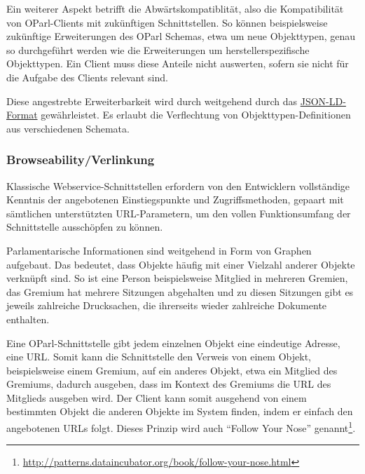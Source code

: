\documentclass[,a4paper]{article}
\begin{document}
Ein weiterer Aspekt betrifft die Abwärtskompatiblität, also die
Kompatibilität von OParl-Clients mit zukünftigen Schnittstellen. So
können beispielsweise zukünftige Erweiterungen des OParl Schemas, etwa
um neue Objekttypen, genau so durchgeführt werden wie die Erweiterungen
um herstellerspezifische Objekttypen. Ein Client muss diese Anteile
nicht auswerten, sofern sie nicht für die Aufgabe des Clients relevant
sind.

Diese angestrebte Erweiterbarkeit wird durch weitgehend durch das
\hyperref[jsonld]{JSON-LD-Format} gewährleistet. Es erlaubt die
Verflechtung von Objekttypen-Definitionen aus verschiedenen Schemata.

\subsubsection{Browseability/Verlinkung}\label{browseabilityux5fverlinkung}

Klassische Webservice-Schnittstellen erfordern von den Entwicklern
vollständige Kenntnis der angebotenen Einstiegspunkte und
Zugriffsmethoden, gepaart mit sämtlichen unterstützten URL-Parametern,
um den vollen Funktionsumfang der Schnittstelle ausschöpfen zu können.

Parlamentarische Informationen sind weitgehend in Form von Graphen
aufgebaut. Das bedeutet, dass Objekte häufig mit einer Vielzahl anderer
Objekte verknüpft sind. So ist eine Person beispielsweise Mitglied in
mehreren Gremien, das Gremium hat mehrere Sitzungen abgehalten und zu
diesen Sitzungen gibt es jeweils zahlreiche Drucksachen, die ihrerseits
wieder zahlreiche Dokumente enthalten.

Eine OParl-Schnittstelle gibt jedem einzelnen Objekt eine eindeutige
Adresse, eine URL. Somit kann die Schnittstelle den Verweis von einem
Objekt, beispielsweise einem Gremium, auf ein anderes Objekt, etwa ein
Mitglied des Gremiums, dadurch ausgeben, dass im Kontext des Gremiums
die URL des Mitglieds ausgeben wird. Der Client kann somit ausgehend von
einem bestimmten Objekt die anderen Objekte im System finden, indem er
einfach den angebotenen URLs folgt. Dieses Prinzip wird auch ``Follow
Your Nose'' genannt\footnote{\url{http://patterns.dataincubator.org/book/follow-your-nose.html}}.

\end{document}
